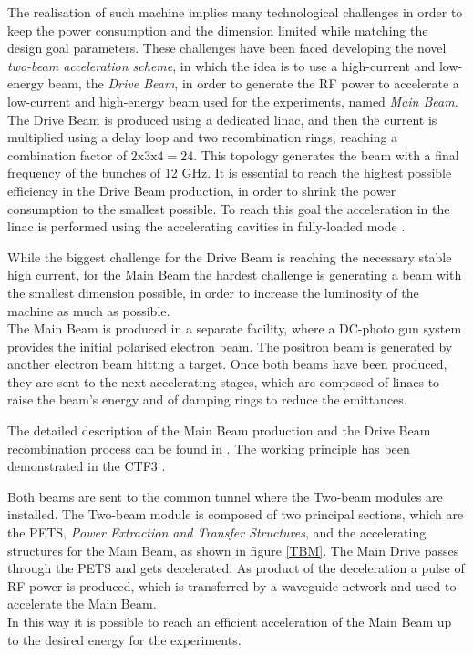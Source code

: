 The realisation of such machine implies many technological challenges in order to keep the power consumption and the dimension limited while matching the design goal parameters. These challenges have been faced developing the novel \textit{two-beam acceleration scheme}, in which the idea is to use a high-current and low-energy beam, the \textit{Drive Beam}, in order to generate the RF power to accelerate a low-current and high-energy beam used for the experiments, named \textit{Main Beam}. \\
The Drive Beam is produced using a dedicated linac, and then the current is multiplied using a delay loop and two recombination rings, reaching a combination factor of $2\text{x}3\text{x}4=24$. This topology generates the beam with a final frequency of the bunches of 12 GHz. It is essential to reach the highest possible efficiency in the Drive Beam production, in order to shrink the power consumption to the smallest possible. To reach this goal the acceleration in the linac is performed using the accelerating cavities in fully-loaded mode \cite{Corsini:791372}.

While the biggest challenge for the Drive Beam is reaching the necessary stable high current, for the Main Beam the hardest challenge is generating a beam with the smallest dimension possible, in order to increase the luminosity of the machine as much as possible.\\
The Main Beam is produced in a separate facility, where a DC-photo gun system provides the initial polarised electron beam. The positron beam is generated by another electron beam hitting a target. Once both beams have been produced, they are sent to the next accelerating stages, which are composed of linacs to raise the beam's energy and of damping rings to reduce the emittances. 

The detailed description of the Main Beam production and the Drive Beam recombination process can be found in \cite{CLIC:cdr}. The working principle has been demonstrated in the CTF3 \cite{CTF:drive_beam}. 

Both beams are sent to the common tunnel where the Two-beam modules are installed. The Two-beam module is composed of two principal sections, which are the PETS, \textit{Power Extraction and Transfer Structures}, and the accelerating structures for the Main Beam, as shown in figure \ref{TBM}. The Main Drive passes through the PETS and gets decelerated. As product of the deceleration a pulse of RF power is produced, which is transferred by a waveguide network and used to accelerate the Main Beam.\\ In this way it is possible to reach an efficient acceleration of the Main Beam up to the desired energy for the experiments.

